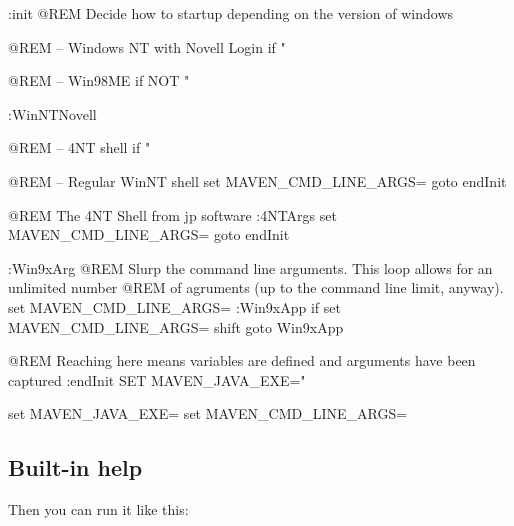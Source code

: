 \documentclass[a4paper,11pt,english,oneside,halfparskip]{scrartcl}
\newcommand{\code}[1]{\texttt{#1}}
\begin{document}
\begin{Cmdline}[caption={Windows Command Shell wrapper \code{mvn.bat}}]
:init
@REM Decide how to startup depending on the version of windows

@REM -- Windows NT with Novell Login
if "%

@REM -- Win98ME
if NOT "%

:WinNTNovell

@REM -- 4NT shell
if "%

@REM -- Regular WinNT shell
set MAVEN_CMD_LINE_ARGS=%
goto endInit

@REM The 4NT Shell from jp software
:4NTArgs
set MAVEN_CMD_LINE_ARGS=%
goto endInit

:Win9xArg
@REM Slurp the command line arguments.  This loop allows for an unlimited number
@REM of agruments (up to the command line limit, anyway).
set MAVEN_CMD_LINE_ARGS=
:Win9xApp
if %
set MAVEN_CMD_LINE_ARGS=%
shift
goto Win9xApp

@REM Reaching here means variables are defined and arguments have been captured
:endInit
SET MAVEN_JAVA_EXE="%


set MAVEN_JAVA_EXE=
set MAVEN_CMD_LINE_ARGS=
\end{Cmdline}


\subsection{Built-in help}	

Then you can run it like this:
\end{document}
